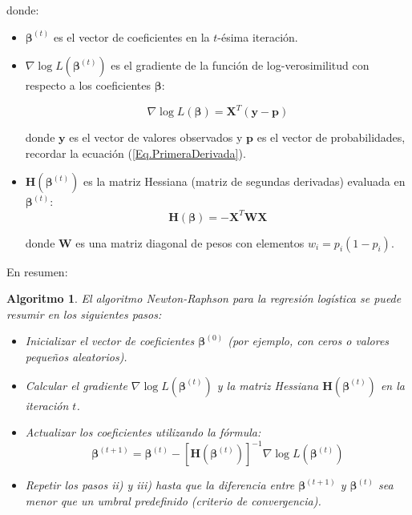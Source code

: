\documentclass[a4paper]{report} %
\newtheorem{Algthm}{Algoritmo}[chapter]
\begin{document}
donde:
\begin{itemize}
    \item[a) ] $\boldsymbol{\beta}^{(t)}$ es el vector de coeficientes en la $t$-\'esima iteraci\'on.
    \item[b) ] $\nabla \log L(\boldsymbol{\beta}^{(t)})$ es el gradiente de la funci\'on de log-verosimilitud con respecto a los coeficientes $\boldsymbol{\beta}$:

\begin{equation}\label{Eq.Gradiente1}
\nabla \log L(\boldsymbol{\beta}) = \mathbf{X}^T (\mathbf{y} - \mathbf{p})
\end{equation}

donde $\mathbf{y}$ es el vector de valores observados y $\mathbf{p}$ es el vector de probabilidades, recordar la ecuaci\'on (\ref{Eq.PrimeraDerivada}).

    \item $\mathbf{H}(\boldsymbol{\beta}^{(t)})$ es la matriz Hessiana (matriz de segundas derivadas) evaluada en $\boldsymbol{\beta}^{(t)}$:
\begin{equation}\label{Eq.Hessiana1}
\mathbf{H}(\boldsymbol{\beta}) = -\mathbf{X}^T \mathbf{W} \mathbf{X}
\end{equation}

donde $\mathbf{W}$ es una matriz diagonal de pesos con elementos $w_i = p_i (1 - p_i)$.

\end{itemize}

En resumen:

\begin{Algthm}\label{Algoritmo1}
El algoritmo Newton-Raphson para la regresi\'on log\'istica se puede resumir en los siguientes pasos:
\begin{itemize}
\item[i) ] Inicializar el vector de coeficientes $\boldsymbol{\beta}^{(0)}$ (por ejemplo, con ceros o valores peque\~nos aleatorios).
\item[ii) ] Calcular el gradiente $\nabla \log L(\boldsymbol{\beta}^{(t)})$ y la matriz Hessiana $\mathbf{H}(\boldsymbol{\beta}^{(t)})$ en la iteraci\'on $t$.
\item[iii) ] Actualizar los coeficientes utilizando la f\'ormula:
\begin{equation}\label{Eq.Criterio1}
\boldsymbol{\beta}^{(t+1)} = \boldsymbol{\beta}^{(t)} - \left[ \mathbf{H}(\boldsymbol{\beta}^{(t)}) \right]^{-1} \nabla \log L(\boldsymbol{\beta}^{(t)})
\end{equation}
\item[iv) ] Repetir los pasos ii) y iii) hasta que la diferencia entre $\boldsymbol{\beta}^{(t+1)}$ y $\boldsymbol{\beta}^{(t)}$ sea menor que un umbral predefinido (criterio de convergencia).
\end{itemize}
\end{Algthm}
\end{document}
